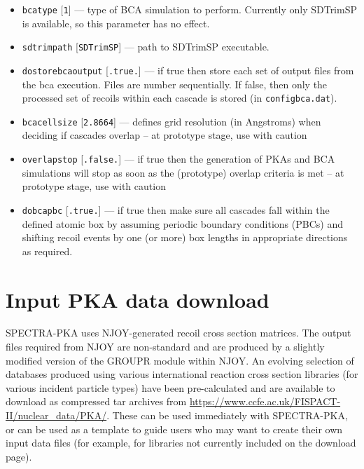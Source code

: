 \documentclass[a4paper]{article}
\begin{document}
\begin{itemize}
\item \texttt{bca{\textunderscore}type} [\texttt{1}] --- type of BCA simulation to perform. Currently only SDTrimSP is available, so this parameter has no effect.

\item \texttt{sdtrim{\textunderscore}path} [\texttt{SDTrimSP}] --- path to SDTrimSP executable.

\item \texttt{do{\textunderscore}store{\textunderscore}bca{\textunderscore}output} [\texttt{.true.}] --- if true then store each set of output files from the bca execution. Files are number sequentially. If false, then only the processed set of recoils within each cascade is stored (in \texttt{config{\textunderscore}bca.dat}).

\item \texttt{bca{\textunderscore}cell{\textunderscore}size} [\texttt{2.8664}] --- defines grid resolution (in Angstroms) when deciding if cascades overlap -- at prototype stage, use with caution

\item \texttt{overlap{\textunderscore}stop} [\texttt{.false.}] --- if true then the generation of PKAs and BCA simulations will stop as soon as the (prototype) overlap criteria is met -- at prototype stage, use with caution

\item \texttt{do{\textunderscore}bca{\textunderscore}pbc} [\texttt{.true.}] --- if true then make sure all cascades fall within the defined atomic box by assuming periodic boundary conditions (PBCs) and shifting recoil events by one (or more) box lengths in appropriate directions as required.


\end{itemize}


\section{Input PKA data download}

SPECTRA-PKA uses NJOY-generated recoil cross section matrices. The output files required from NJOY are non-standard and are produced by a slightly modified version of the GROUPR module within NJOY. An evolving selection of databases produced using various international reaction cross section libraries (for various incident particle types) have been pre-calculated and are available to download as compressed tar archives from \url{https://www.ccfe.ac.uk/FISPACT-II/nuclear_data/PKA/}. These can be used immediately with SPECTRA-PKA, or can be used as a template to guide users who may want to create their own input data files (for example, for libraries not currently included on the download page).
\end{document}
